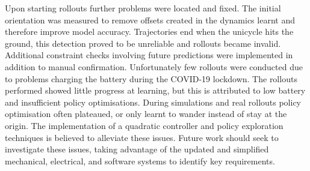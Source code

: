 \documentclass[twoside,twocolumn,12pt]{article}
\begin{document}
\newline
\newline
Upon starting rollouts further problems were located and fixed. The initial orientation was measured to remove offsets created in the dynamics learnt and therefore improve model accuracy. Trajectories end when the unicycle hits the ground, this detection proved to be unreliable and rollouts became invalid. Additional constraint checks involving future predictions were implemented in addition to manual confirmation.
\newline
\newline
Unfortunately few rollouts were conducted due to problems charging the battery during the COVID-19 lockdown. The rollouts performed showed little progress at learning, but this is attributed to low battery and insufficient policy optimisations.
\newline
\newline
During simulations and real rollouts policy optimisation often plateaued, or only learnt to wander instead of stay at the origin. The implementation of a quadratic controller and policy exploration techniques is believed to alleviate these issues.
\newline
\newline
Future work should seek to investigate these issues, taking advantage of the updated and simplified mechanical, electrical, and software systems to identify key requirements. 
\end{document}
